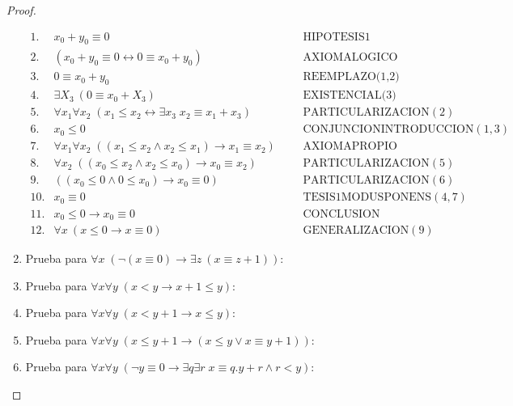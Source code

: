 \begin{proof}
\begin{enumerate}[(1)]
          $\begin{array}{lllll}
            1. & x_{0} + y_{0} \equiv 0 &&& \text{HIPOTESIS}1 \\
            2. & (x_{0} + y_{0} \equiv 0 \leftrightarrow 0 \equiv x_{0} + y_{0}) &&& \text{AXIOMALOGICO} \\
            3. & 0\equiv x_{0} + y_{0} &&& \text{REEMPLAZO(1,2)} \\
            4. & \exists X_{3} \ (0 \equiv x_{0} + X_{3}) &&& \text{EXISTENCIAL(3)} \\
            5. & \forall x_{1}\forall x_{2}\;(x_{1}\leq x_{2}\leftrightarrow \exists x_{3}\;x_{2}\equiv x_{1}+x_{3}) &&& \text{PARTICULARIZACION}(2) \\
            6. & x_{0}\leq 0 &&& \text{CONJUNCIONINTRODUCCION}(1,3) \\
            7. & \forall x_{1}\forall x_{2}\;((x_{1}\leq x_{2}\wedge x_{2}\leq x_{1})\rightarrow x_{1}\equiv x_{2}) &&& \text{AXIOMAPROPIO} \\
            8. & \forall x_{2}\;((x_{0}\leq x_{2}\wedge x_{2}\leq x_{0})\rightarrow x_{0}\equiv x_{2}) &&& \text{PARTICULARIZACION}(5) \\
            9. & ((x_{0}\leq 0\wedge 0\leq x_{0})\rightarrow x_{0}\equiv 0) &&& \text{PARTICULARIZACION}(6) \\
            10. & x_{0}\equiv 0 &&& \text{TESIS}1\text{MODUSPONENS}(4,7) \\
            11. & x_{0} \leq 0 \rightarrow x_{0} \equiv 0 &&& \text{CONCLUSION} \\
            12. & \forall x \ (x \leq 0 \rightarrow x \equiv 0) &&& \text{GENERALIZACION}(9)
          \end{array}$

        \item Prueba para $\forall x \; (\lnot (x \equiv 0) \rightarrow \exists z \ (x \equiv z + 1))$:
        \item Prueba para $\forall x \forall y \; (x < y \rightarrow x + 1 \leq y)$:
        \item Prueba para $\forall x \forall y \; (x < y + 1 \rightarrow x \leq y)$:
        \item Prueba para $\forall x \forall y \; (x \leq y+1 \rightarrow (x \leq y \vee x \equiv y+1))$:
        \item Prueba para $\forall x \forall y \; (\lnot y \equiv 0 \rightarrow \exists q \exists r \; x \equiv q.y+r
          \wedge r < y)$:
    \end{enumerate}

  \end{proof}

